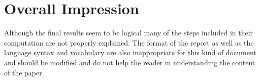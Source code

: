 \section{Overall Impression}%

Although the final results seem to be logical many of the steps included in their computation are not properly explained.
The format of the report as well as the language syntax and vocabulary are also inappropriate for this kind of document and should be modified 
and do not help the reader in understanding the content of the paper.

